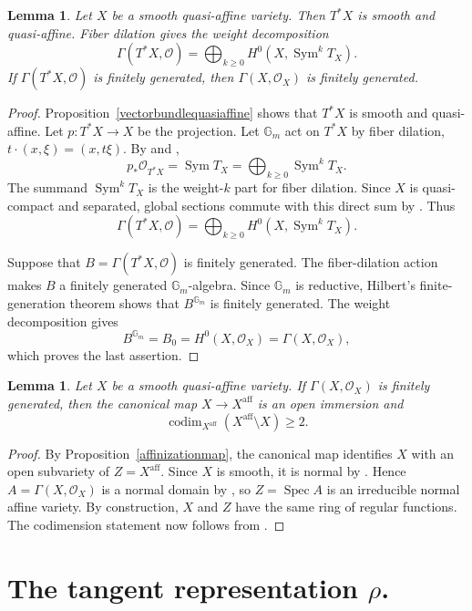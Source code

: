 \documentclass[12pt]{article}
\newtheorem{lemma}[theorem]{Lemma}
\theoremstyle{definition}
\DeclareMathOperator{\Spec}{Spec}
\DeclareMathOperator{\Sym}{Sym}
\newcommand{\Gm}{\mathbb G_m}
\newcommand{\OO}{\mathcal O}
\newcommand{\aff}{\mathrm{aff}}
\begin{document}
\begin{lemma}\label{cotangentgrading}
    Let $X$ be a smooth quasi-affine variety. Then $T^*X$ is smooth and quasi-affine. Fiber dilation gives the weight decomposition
    \[
        \Gamma(T^*X,\OO)
        =\bigoplus_{k\ge0}H^0(X,\Sym^kT_X).
    \]
    If $\Gamma(T^*X,\OO)$ is finitely generated, then $\Gamma(X,\OO_X)$ is finitely generated.
\end{lemma}
\begin{proof}
    Proposition~\ref{vectorbundlequasiaffine} shows that $T^*X$ is smooth and quasi-affine. Let $p:T^*X\to X$ be the projection. Let $\Gm$ act on $T^*X$ by fiber dilation,
    $t\cdot(x,\xi)=(x,t\xi)$. By \cite[Definition~27.6.1]{Stacks} and \cite[Lemma~27.4.6]{Stacks},
    \[
        p_*\OO_{T^*X}=\Sym T_X=\bigoplus_{k\ge0}\Sym^kT_X.
    \]
    The summand $\Sym^kT_X$ is the weight-$k$ part for fiber dilation. Since $X$ is quasi-compact and separated, global sections commute with this direct sum by \cite[Lemma~30.6.1]{Stacks}. Thus
    \[
        \Gamma(T^*X,\OO)
        =\bigoplus_{k\ge0}H^0(X,\Sym^kT_X).
    \]

    Suppose that $B=\Gamma(T^*X,\OO)$ is finitely generated. The fiber-dilation action makes $B$ a finitely generated $\Gm$-algebra. Since $\Gm$ is reductive, Hilbert's finite-generation theorem shows that $B^{\Gm}$ is finitely generated. The weight decomposition gives
    \[
        B^{\Gm}=B_0=H^0(X,\OO_X)=\Gamma(X,\OO_X),
    \]
    which proves the last assertion.
\end{proof}

\begin{lemma}\label{smallboundary}
    Let $X$ be a smooth quasi-affine variety. If $\Gamma(X,\OO_X)$ is finitely generated, then the canonical map $X\to X^\aff$ is an open immersion and
    \[
        \operatorname{codim}_{X^\aff}(X^\aff\setminus X)\ge2.
    \]
\end{lemma}
\begin{proof}
    By Proposition~\ref{affinizationmap}, the canonical map identifies $X$ with an open subvariety of $Z=X^\aff$. Since $X$ is smooth, it is normal by \cite[Lemma~33.25.4]{Stacks}. Hence $A=\Gamma(X,\OO_X)$ is a normal domain by \cite[Lemma~28.7.9]{Stacks}, so $Z=\Spec A$ is an irreducible normal affine variety. By construction, $X$ and $Z$ have the same ring of regular functions. The codimension statement now follows from \cite[Theorem~4.2]{Grosshans}.
\end{proof}

\section{The tangent representation $\rho$.}\label{tangentsection}
\end{document}
